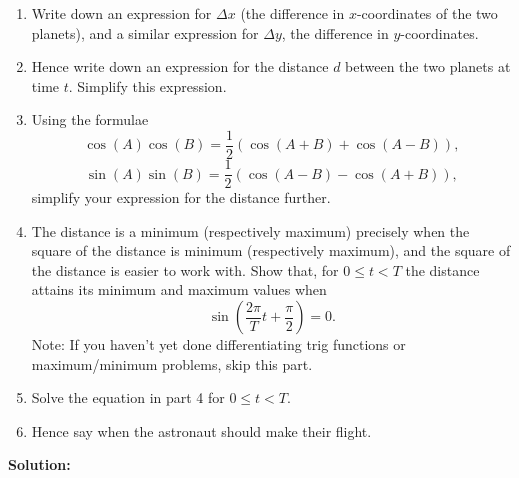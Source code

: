 \documentclass{article}
\begin{document}
\begin{enumerate}
\item Write down an expression for $\Delta x$ (the difference in $x$-coordinates of the two planets), and a similar expression for $\Delta y$, the difference in $y$-coordinates.
\item Hence write down an expression for the distance $d$ between the two planets at time $t$. Simplify this expression.
\item Using the formulae
	\[\cos(A)\cos(B)=\frac{1}{2}(\cos(A+B)+\cos(A-B)),\]
	\[\sin(A)\sin(B)=\frac{1}{2}(\cos(A-B)-\cos(A+B)),\]
	simplify your expression for the distance further.
\item The distance is a minimum (respectively maximum) precisely when the square of the distance is minimum (respectively maximum), and the square of the distance is easier to work with. 		Show that, for $0\leq t<T$ the distance attains its minimum and maximum values when
	\[\sin\left(\frac{2\pi}{T}t+\frac{\pi}{2}\right)=0.\]
	Note: If you haven't yet done differentiating trig functions or maximum/minimum problems, skip this part.
\item Solve the equation in part 4 for $0\leq t<T$.
\item Hence say when the astronaut should make their flight.
\end{enumerate}


\clearpage



\textbf{Solution:}

\vspace{5mm}
\end{document}
